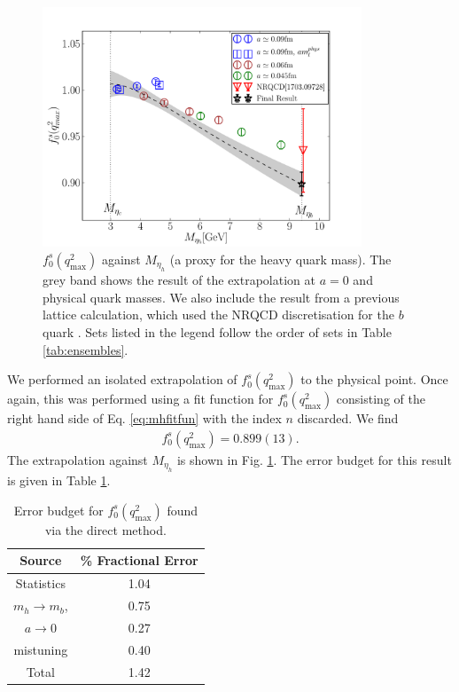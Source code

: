 \begin{figure}[htb!]
  \begin{center}
  \hspace{-10pt}
  \includegraphics[width=0.85\textwidth]{images/BsDs/direct/f0q2max_vsmh.pdf}
  \caption{ $f_0^s(q^2_{\text{max}})$ against $M_{\eta_h}$ (a proxy for the heavy quark mass). The grey band shows the result of the extrapolation at $a=0$ and physical quark masses. We also include the result from a previous lattice calculation, which used the NRQCD discretisation for the $b$ quark \cite{Monahan:2017uby}. Sets listed in the legend follow the order of sets in Table \ref{tab:ensembles}. \label{fig:directq2max}}
  \end{center}
\end{figure}

We performed an isolated extrapolation of $f^s_0(q^2_{\text{max}})$ to the physical point. Once again, this was performed using a fit function for $f^s_0(q^2_{\text{max}})$ consisting of the right hand side of Eq. \eqref{eq:mhfitfun} with the index $n$ discarded. We find
\begin{align}
  f_0^s(q^2_{\text{max}}) = 0.899(13).
  \label{eq:f0s_direct}
\end{align}
The extrapolation against $M_{\eta_h}$ is shown in Fig. \ref{fig:directq2max}. The error budget for this result is given in Table \ref{directq2max_budget}.

\begin{table}[htb!]
  \begin{center}
    \begin{tabular}{c c}
      \hline
      Source & \% Fractional Error \\ [0.5ex]
      \hline
      Statistics & 1.04  \\ [1ex]
      $m_h \to m_b$, & 0.75  \\ [1ex]
      $a\to 0$ & 0.27  \\ [1ex]
      mistuning & 0.40 \\ [1ex]
      \hline
      Total & 1.42 \\ [1ex]
      \hline
    \end{tabular}
  \end{center}
  \caption{Error budget for $f_0^s(q^2_{\text{max}})$ found via the direct method.\label{directq2max_budget}}
\end{table}

